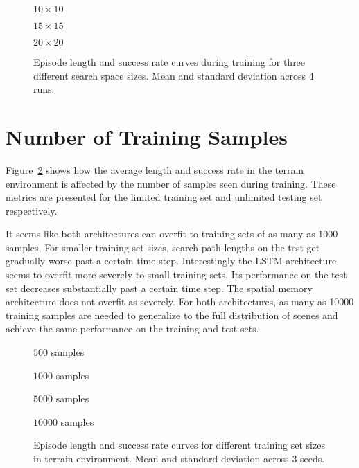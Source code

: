 \begin{figure}
    \centering
    \(10 \times 10\)
    
    \(15 \times 15\)
    
    \(20 \times 20\)
    
    \caption[Learning curves for different search space sizes.]{Episode length and success rate curves during training for three different search space sizes. Mean and standard deviation across 4 runs.}
    \label{fig:shape}
\end{figure}

\section{Number of Training Samples}
\label{sec:sample}

Figure~\ref{fig:sample} shows how the average length and success rate in the terrain environment is affected by the number of samples seen during training.
These metrics are presented for the limited training set and unlimited testing set respectively.

It seems like both architectures can overfit to training sets of as many as 1000 samples,
For smaller training set sizes, search path lengths on the test get gradually worse past a certain time step.
Interestingly the LSTM architecture seems to overfit more severely to small training sets.
Its performance on the test set decreases substantially past a certain time step.
The spatial memory architecture does not overfit as severely.
For both architectures, as many as 10000 training samples are needed to generalize to the full distribution of scenes and achieve the same performance on the training and test sets. 

\begin{figure}
    \centering
    \(500\) samples
    
    \(1000\) samples
    
    \(5000\) samples
    
    \(10000\) samples
    
    \caption[Learning curves for varying training set sizes.]{Episode length and success rate curves for different training set sizes in terrain environment. Mean and standard deviation across 3 seeds.}
    \label{fig:sample}
\end{figure}
